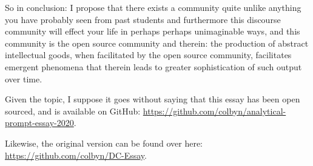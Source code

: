 So in conclusion: I propose that there exists a community quite unlike anything you have probably seen from past students and furthermore this discourse community will effect your life in perhaps perhaps unimaginable ways, and this community is the open source community and therein: the production of abstract intellectual goods, when facilitated by the open source community, facilitates emergent phenomena that therein leads to greater sophistication of such output over time. 


\begin{center}
Given the topic, I suppose it goes without saying that this essay has been open sourced, and is available on GitHub:
\url{https://github.com/colbyn/analytical-prompt-essay-2020}.

Likewise, the original version can be found over here: \url{https://github.com/colbyn/DC-Essay}.
\end{center}






